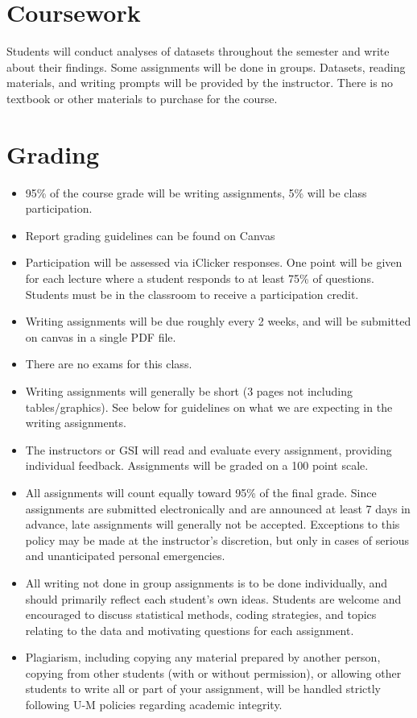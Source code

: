 \documentclass[11pt]{article}
\begin{document}
\section*{Coursework}

Students will conduct analyses of datasets throughout the semester and write about their findings.
Some assignments will be done in groups.
Datasets, reading materials, and writing prompts will be provided by the instructor.
There is no textbook or other materials to purchase for the course.

\section*{Grading}
\begin{itemize}
	\item 95\% of the course grade will be writing assignments, 5\% will be class participation.
	\item Report grading guidelines can be found on Canvas
	\item Participation will be assessed via iClicker responses.  One point will be given for each lecture where a student responds to at least 75\% of questions.  Students must be in the classroom to receive a participation credit.
	\item Writing assignments will be due roughly every 2 weeks, and will be submitted on canvas in a single PDF file.
	\item There are no exams for this class.
	\item Writing assignments will generally be short (3 pages not including tables/graphics). See below for guidelines on what we are expecting in the writing assignments.
	\item The instructors or GSI will read and evaluate every assignment, providing individual feedback. Assignments will be graded on a 100 point scale.
	\item All assignments will count equally toward 95\% of the final grade. Since assignments are submitted electronically and are announced at least 7 days in advance, late assignments will generally not be accepted. Exceptions to this policy may be made at the instructor’s discretion, but only in cases of serious and unanticipated personal emergencies.
	\item All writing not done in group assignments is to be done individually, and should primarily reflect each student’s own ideas. Students are welcome and encouraged to discuss statistical methods, coding strategies, and topics relating to the data and motivating questions for each assignment.
	\item Plagiarism, including copying any material prepared by another person, copying from other students (with or without permission), or allowing other students to write all or part of your assignment, will be handled strictly following U-M policies regarding academic integrity.
\end{itemize}
\end{document}
